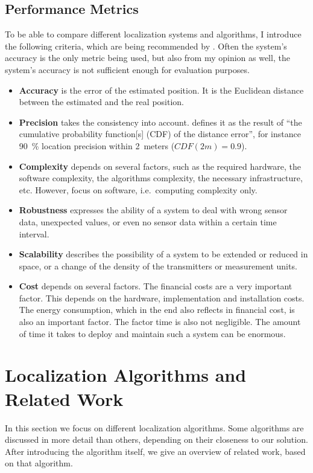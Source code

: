 \subsection{Performance Metrics}
To be able to compare different localization systems and algorithms, I introduce the following criteria, which are being recommended by \citet{IEEE:survey_wireless_indoor_pos}. Often the system's accuracy is the only metric being used, but also from my opinion as well, the system's accuracy is not sufficient enough for evaluation purposes.
\begin{itemize}
	\item \textbf{Accuracy} is the error of the estimated position. It is the Euclidean distance between the estimated and the real position.
	\item \textbf{Precision} takes the consistency into account. \citet{IEEE:survey_wireless_indoor_pos} defines it as the result of ``the cumulative probability function[s] (CDF) of the distance error'', for instance 90~\% location precision within 2~meters ($CDF(2m) = 0.9$).
	\item \textbf{Complexity} depends on several factors, such as the required hardware, the software complexity, the algorithms complexity, the necessary infrastructure, etc. However, \citet{IEEE:survey_wireless_indoor_pos} focus on software, i.e.\ computing complexity only.
	\item \textbf{Robustness} expresses the ability of a system to deal with wrong sensor data, unexpected values, or even no sensor data within a certain time interval.
	\item \textbf{Scalability} describes the possibility of a system to be extended or reduced in space, or a change of the density of the transmitters or measurement units.
	\item \textbf{Cost} depends on several factors. The financial costs are a very important factor. This depends on the hardware, implementation and installation costs. The energy consumption, which in the end also reflects in financial cost, is also an important factor. The factor time is also not negligible. The amount of time it takes to deploy and maintain such a system can be enormous.
\end{itemize}


\section{Localization Algorithms and Related Work}
In this section we focus on different localization algorithms. Some algorithms are discussed in more detail than others, depending on their closeness to our solution. After introducing the algorithm itself, we give an overview of related work, based on that algorithm. 

